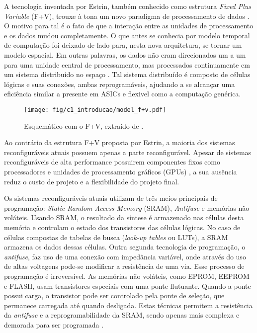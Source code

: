 \documentclass[11pt,a4paper,oneside]{book}
\begin{document}
A tecnologia inventada por Estrin, tamb\'em conhecido como estrutura \textit{Fixed Plus Variable} (F+V), trouxe \`a tona um novo paradigma de processamento de dados \cite{Hartenstein2001}.
O motivo para tal \'e o fato de que a intera\c{c}\~ao entre as unidades de processamento e os dados mudou completamente.
O que antes se conhecia por modelo temporal de computa\c{c}\~ao foi deixado de lado para, nesta nova arquitetura, se tornar um modelo espacial.
Em outras palavras, os dados n\~ao eram direcionados um a um para uma unidade central de processamento, mas processados continuamente em um sistema distribu\'i­do no espa\c{c}o \cite{vassiliadis2007fine}.
Tal sistema distribu\'i­do \'e composto de c\'elulas l\'ogicas e suas conex\~oes, ambas reprogram\'aveis, ajudando a se alcan\c{c}ar uma efici\^encia similar a presente em ASICs e flexivel como a computa\c{c}\~ao gen\'erica.

\begin{figure}[h]
\centering
\texttt{[image: fig/c1\_introducao/model\_f+v.pdf]}
\caption{Esquem\'atico com o F+V, extraido de \cite{Estrin2002}.}
\label{fig:model_f+v}
\end{figure}

Ao contr\'ario da estrutura F+V proposta por Estrin, a maioria dos sistemas reconfigur\'aveis atuais possuem apenas a parte reconfigur\'avel.
Apesar de sistemas reconfigur\'aveis de alta performance possuirem componentes fixos como processadores e unidades de processamento gr\'aficos (GPUs) \cite{El-Ghazawi2008}, a sua aus\^encia reduz o custo de projeto e a flexibilidade do projeto final.

Os sistemas reconfigur\'aveis atuais utilizam de tr\^es meios principais de programa\c{c}\~ao: \textit{Static Random-Access Memory} (SRAM), \textit{Antifuse} e mem\'orias n\~ao-vol\'ateis.
Usando SRAM, o resultado da s\'i­ntese
 \'e armazenado nas c\'elulas desta mem\'oria e controlam o estado dos transistores das c\'elulas l\'ogicas.
No caso de c\'elulas compostas de tabelas de busca (\textit{look-up tables} ou LUTs), a SRAM armazena os dados dessas c\'elulas.
Outra segunda tecnologia de programa\c{c}\~ao, o \textit{antifuse}, faz uso de uma conex\~ao com imped\^ancia vari\'avel, onde atrav\'es do uso de altas voltagens pode-se modificar a resist\^encia de uma via.
Esse processo de programa\c{c}\~ao \'e irrevers\'i­vel.
As mem\'orias n\~ao vol\'ateis, como EPROM, EEPROM e FLASH, usam transistores especiais com uma ponte flutuante.
Quando a ponte possui carga, o transistor pode ser controlado pela ponte de sele\c{c}\~ao, que permanece carregada at\'e quando desligada.
Estas t\'ecnicas permitem a resist\^encia da \textit{antifuse} e a reprogramabilidade da SRAM, sendo apenas mais complexa e demorada para ser programada \cite{vassiliadis2007fine}.
\end{document}
